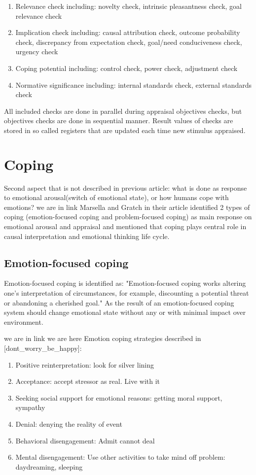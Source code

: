 \begin{enumerate}
\item  Relevance check including: novelty check, intrinsic pleasantness check, goal relevance check
\item  Implication check including: causal attribution check, outcome probability check, discrepancy from expectation check, goal/need conduciveness check, urgency check
\item  Coping potential including: control check, power check, adjustment check
\item  Normative significance including: internal standards check, external standards check
\end{enumerate}

All included checks are done in parallel during appraisal objectives checks, but objectives checks are done in sequential manner.
Result values of checks are stored in so called registers that are updated each time new stimulus appraised.

\section{Coping}

Second aspect that is not described in previous article: what is done as response to emotional arousal(switch of emotional state), or how humans cope with emotions?
we are in link
Marsella and Gratch in their article \cite{dont_worry_be_happy} identified 2 types of coping (emotion-focused coping and problem-focused coping) as main response on emotional arousal and appraisal and mentioned that coping plays central role in causal interpretation and emotional thinking life cycle.

\subsection{Emotion-focused coping}

Emotion-focused coping is identified as: "Emotion-focused coping works altering one’s interpretation of circumstances, for example, discounting a potential threat or abandoning a cherished goal." As the result of an emotion-focused coping system should change emotional state without any or with minimal impact over environment.

we are in link
we are here Emotion coping strategies described in [dont_worry_be_happy]:


\begin{enumerate}
\item  Positive reinterpretation: look for silver lining
\item  Acceptance: accept stressor as real. Live with it
\item  Seeking  social  support  for  emotional  reasons: getting moral support, sympathy
\item  Denial: denying the reality of event
\item  Behavioral disengagement: Admit cannot deal
\item  Mental  disengagement:  Use  other  activities  to take mind off problem: daydreaming, sleeping
\end{enumerate}



